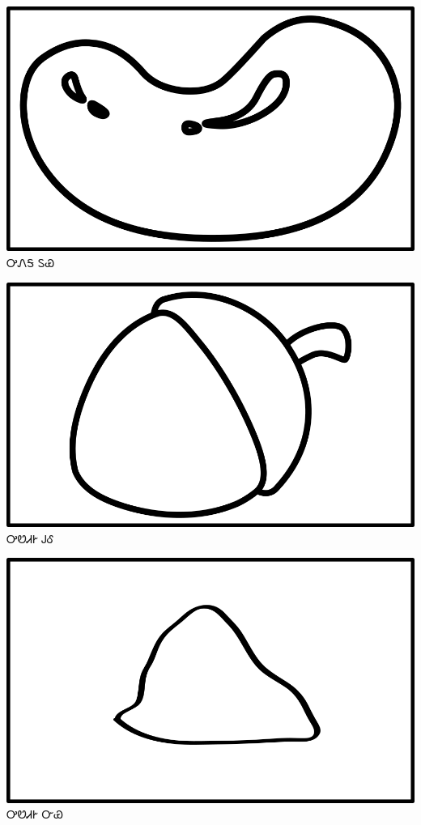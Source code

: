 \documentclass[avery5371]{flashcards}%
\begin{document}
    \begin{flashcard}{
        \includegraphics[width=0.95\columnwidth,height=.51\columnwidth,keepaspectratio]{../artwork/objects-neutral/tuya}
    }
        \Huge ᎤᏁᎦ ᏚᏯ
    \end{flashcard}

    \begin{flashcard}{
        \includegraphics[width=0.95\columnwidth,height=.51\columnwidth,keepaspectratio]{../artwork/objects-neutral/gule}
    }
        \Huge ᎤᏬᏗᎨ ᎫᎴ
    \end{flashcard}

    \begin{flashcard}{
        \includegraphics[width=0.95\columnwidth,height=.51\columnwidth,keepaspectratio]{../artwork/objects-neutral/nvya}
    }
        \Huge ᎤᏬᏗᎨ ᏅᏯ
    \end{flashcard}
\end{document}
